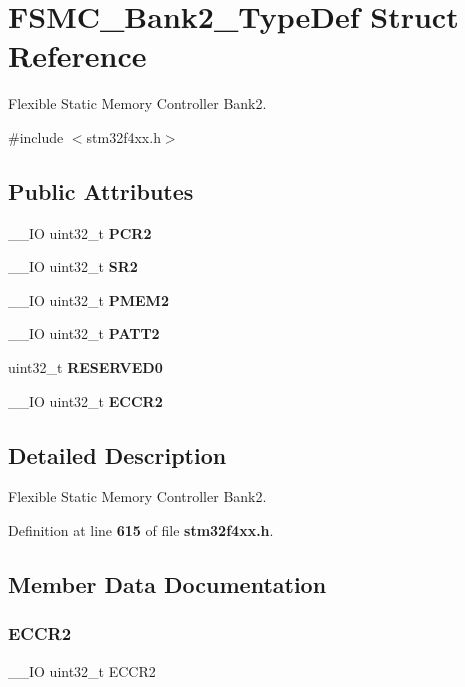 \section{F\+S\+M\+C\+\_\+\+Bank2\+\_\+\+Type\+Def Struct Reference}
\label{structFSMC__Bank2__TypeDef}


Flexible Static Memory Controller Bank2.  




{\ttfamily \#include $<$stm32f4xx.\+h$>$}

\subsection*{Public Attributes}
\begin{DoxyCompactItemize}
\item 
\+\_\+\+\_\+\+IO uint32\+\_\+t \textbf{ P\+C\+R2}
\item 
\+\_\+\+\_\+\+IO uint32\+\_\+t \textbf{ S\+R2}
\item 
\+\_\+\+\_\+\+IO uint32\+\_\+t \textbf{ P\+M\+E\+M2}
\item 
\+\_\+\+\_\+\+IO uint32\+\_\+t \textbf{ P\+A\+T\+T2}
\item 
uint32\+\_\+t \textbf{ R\+E\+S\+E\+R\+V\+E\+D0}
\item 
\+\_\+\+\_\+\+IO uint32\+\_\+t \textbf{ E\+C\+C\+R2}
\end{DoxyCompactItemize}


\subsection{Detailed Description}
Flexible Static Memory Controller Bank2. 

Definition at line \textbf{ 615} of file \textbf{ stm32f4xx.\+h}.



\subsection{Member Data Documentation}
\mbox{\label{structFSMC__Bank2__TypeDef_a05a47a1664adc7a3db3fa3e83fe883b4}} 
\subsubsection{E\+C\+C\+R2}
{\footnotesize\ttfamily \+\_\+\+\_\+\+IO uint32\+\_\+t E\+C\+C\+R2}

